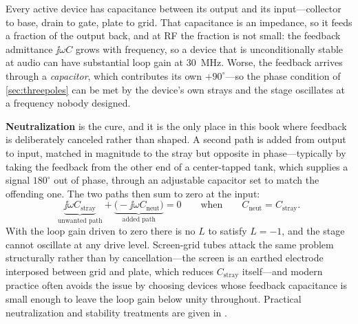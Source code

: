 Every active device has capacitance between its output and its input---collector to
base, drain to gate, plate to grid. That capacitance is an impedance, so it feeds a
fraction of the output back, and at RF the fraction is not small: the feedback
admittance \(\jj\omega C\) grows with frequency, so a device that is unconditionally
stable at audio can have substantial loop gain at \SI{30}{\mega\hertz}. Worse, the
feedback arrives through a \emph{capacitor}, which contributes its own
\(+90^\circ\)---so the phase condition of \cref{sec:threepoles} can be met by the
device's own strays and the stage oscillates at a frequency nobody designed.

\textbf{Neutralization} is the cure, and it is the only place in this book where
feedback is deliberately canceled rather than shaped. A second path is added from
output to input, matched in magnitude to the stray but opposite in phase---typically
by taking the feedback from the other end of a center-tapped tank, which supplies a
signal \(180^\circ\) out of phase, through an adjustable capacitor set to match the
offending one. The two paths then sum to zero at the input:
\[
\underbrace{\jj\omega C_{\text{stray}}}_{\text{unwanted path}}
+\underbrace{\bigl(-\jj\omega C_{\text{neut}}\bigr)}_{\text{added path}}=0
\qquad\text{when}\qquad
C_{\text{neut}}=C_{\text{stray}} .
\]
With the loop gain driven to zero there is no \(L\) to satisfy \(L=-1\), and the
stage cannot oscillate at any drive level. Screen-grid tubes attack the same problem
structurally rather than by cancellation---the screen is an earthed electrode
interposed between grid and plate, which reduces \(C_{\text{stray}}\) itself---and
modern practice often avoids the issue by choosing devices whose feedback capacitance
is small enough to leave the loop gain below unity throughout.
Practical neutralization and stability treatments are given in
\cite[pp.~185--195]{davis2011rfcircuit}.

